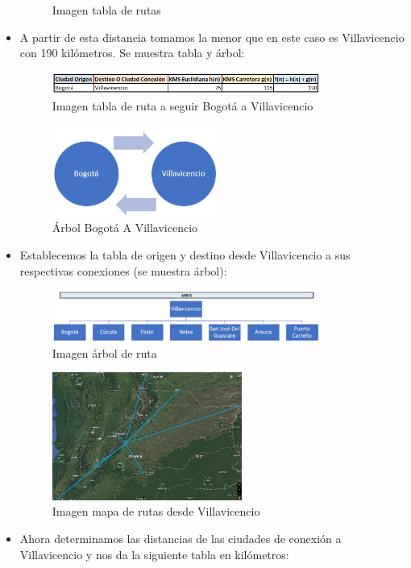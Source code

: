\documentclass[conference]{IEEEtran}
\begin{document}
\begin{itemize}
\begin{figure}[ht!]
			\caption{Imagen tabla de rutas}
			\label{picture}
		\end{figure}
	\item A partir de esta distancia tomamos la menor que en este caso es Villavicencio con 190 kilómetros. Se muestra tabla y árbol:
		\begin{figure}[ht!] %
			\centering
			\includegraphics[width=3.45in]{Imagen7.png}
			\caption{Imagen tabla de ruta a seguir Bogotá a Villavicencio}
			\label{picture}
		\end{figure}
		\begin{figure}[ht!] %
			\centering
			\includegraphics[width=2.15in]{Imagen8.png}
			\caption{Árbol Bogotá A Villavicencio}
			\label{picture}
		\end{figure}
	\item Establecemos la tabla de origen y destino desde Villavicencio a sus respectivas conexiones (se muestra árbol):
		\begin{figure}[ht!] %
			\centering
			\includegraphics[width=3.45in]{Imagen9.png}
			\caption{Imagen árbol de ruta}
			\label{picture}
		\end{figure}
		\begin{figure}[ht!] %
			\centering
			\includegraphics[width=2.45in]{Imagen16.png}
			\caption{Imagen mapa de rutas desde Villavicencio}
			\label{picture}
		\end{figure}
	\item Ahora determinamos las distancias de las ciudades de conexión a Villavicencio y nos da la siguiente tabla en kilómetros:

\end{itemize}
\end{document}
